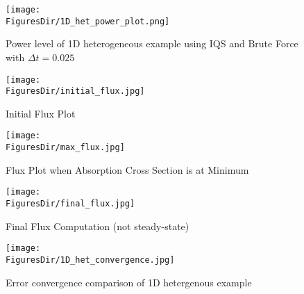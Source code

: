 \documentclass[12pt]{scrartcl}
\newcommand{\FiguresDir}{./figs}
\begin{document}
\begin{figure}[!htbp]
\texttt{[image: \\FiguresDir/1D\_het\_power\_plot.png]}
\caption{Power level of 1D heterogeneous example using IQS and Brute Force with $\Delta t = 0.025$}
\label{fig:power}
\end{figure}

\begin{figure}[!htbp]
\begin{center}
\texttt{[image: \\FiguresDir/initial\_flux.jpg]}
\caption{Initial Flux Plot}
\label{fig:initial}
\end{center}
\end{figure}

\begin{figure}[!htbp]
\begin{center}
\texttt{[image: \\FiguresDir/max\_flux.jpg]}
\caption{Flux Plot when Absorption Cross Section is at Minimum}
\label{fig:max}
\end{center}
\end{figure}

\begin{figure}[!htbp]
\begin{center}
\texttt{[image: \\FiguresDir/final\_flux.jpg]}
\caption{Final Flux Computation (not steady-state)}
\label{fig:final}
\end{center}
\end{figure}

\begin{figure}[!htbp]
\centering
\texttt{[image: \\FiguresDir/1D\_het\_convergence.jpg]}
\caption{Error convergence comparison of 1D hetergenous example}
\label{fig:conv}
\end{figure}
\end{document}
